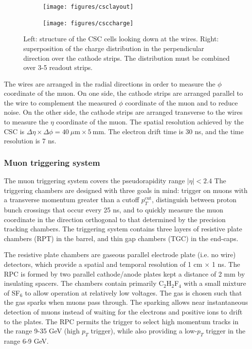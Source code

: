 \begin{figure}[!hbpt]
  \centering
  \begin{subfigure}[b]{0.45\textwidth}
      \texttt{[image: figures/csclayout]}
      \caption{}
      \label{fig:csclayout}
  \end{subfigure}
  \quad\quad\quad
  \begin{subfigure}[b]{0.45\textwidth}
  \centering
    \texttt{[image: figures/csccharge]}
    \caption{}
    \label{fig:csccharge}
  \end{subfigure}
  \caption{Left: structure of the CSC cells looking down at the wires. 
  Right: superposition of the charge distribution in the perpendicular direction
  over the cathode strips. The distribution must be combined over 3-5 readout strips.}
  \label{fig:csc}
\end{figure}

The wires are arranged in the radial directions in order to measure the $\phi$
coordinate of the muon. On one side, the cathode strips are arranged parallel to 
the wire to complement the measured $\phi$ coordinate of the muon and to reduce noise.
On the other side, the cathode strips are arranged transverse to the wires to measure
the $\eta$ coordinate of the muon. The spatial resolution achieved by the CSC
is $\Delta \eta \times \Delta \phi = 40~\mu\mathrm{m} \times 5~\mathrm{mm}$.
The electron drift time is 30 ns, and the time resolution is 7 ns.

\subsubsection*{Muon triggering system}
The muon triggering system covers the pseudorapidity range $|\eta| < 2.4$  The
triggering chambers are designed with three goals in mind: trigger on muons with 
a transverse momentum greater than a cutoff $p_T^{\text{cut}}$, distinguish
between proton bunch crossings that occur every 25 ns, and to quickly measure the 
muon coordinate in the direction orthogonal to that determined by the 
precision tracking chambers. The triggering system contains three layers of
resistive plate chambers (RPT) in the barrel, and thin gap chambers (TGC) 
in the end-caps.

The resistive plate chambers are gaseous parallel electrode plate (i.e. no wire)
detectors, which provide a spatial and temporal resolution of 1 cm $\times$ 1 ns.
The RPC is formed by two parallel cathode/anode plates kept a distance of 2 mm by
insulating spacers. The chambers contain primarily C$_2$H$_2$F$_4$ with a
small mixture of SF$_6$ to allow operation at relatively low voltages.
The gas is chosen such that the gas sparks when muons pass through. The sparking
allows near instantaneous detection of muons instead of waiting for the electrons
and positive ions to drift to the plates. The RPC permits the trigger to select
high momentum tracks in the range 9-35 GeV (high $p_T$ trigger), while
also providing a low-$p_T$ trigger in the range 6-9 GeV.

